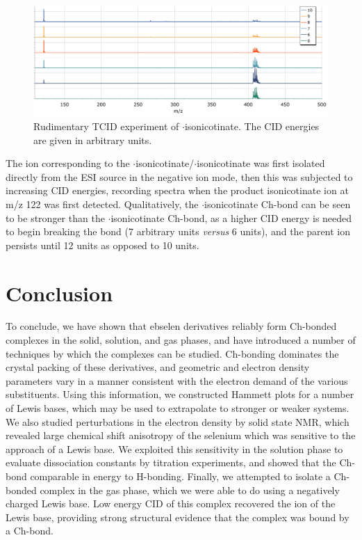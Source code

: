\begin{refsection}
\begin{figure}
  \centering
  \includegraphics[width=\linewidth]{Figures/ebs-bn-cid.pdf}
  \caption[TCID experiment of $ \cdot $isonicotinate.]{Rudimentary TCID experiment of $ \cdot $isonicotinate. The CID energies are given in arbitrary units.}\label{fig:ebs-bn-tcid}
\end{figure}

The ion corresponding to the $ \cdot $isonicotinate/$ \cdot $isonicotinate was first isolated directly from the ESI source in the negative ion mode, then this was subjected to increasing CID energies, recording spectra when the product isonicotinate ion at m/z 122 was first detected.
Qualitatively, the $ \cdot $isonicotinate Ch-bond can be seen to be stronger than the $ \cdot $isonicotinate Ch-bond, as a higher CID energy is needed to begin breaking the bond (7 arbitrary units \emph{versus} 6 units), and the parent ion persists until 12 units as opposed to 10 units.

\section{Conclusion}
To conclude, we have shown that ebselen derivatives reliably form Ch-bonded complexes in the solid, solution, and gas phases, and have introduced a number of techniques by which the complexes can be studied.
Ch-bonding dominates the crystal packing of these derivatives, and geometric and electron density parameters vary in a manner consistent with the electron demand of the various substituents.
Using this information, we constructed Hammett plots for a number of Lewis bases, which may be used to extrapolate to stronger or weaker systems.
We also studied perturbations in the electron density by solid state NMR, which revealed large chemical shift anisotropy of the selenium which was sensitive to the approach of a Lewis base.
We exploited this sensitivity in the solution phase to evaluate dissociation constants by titration experiments, and showed that the Ch-bond comparable in energy to H-bonding.
Finally, we attempted to isolate a Ch-bonded complex in the gas phase, which we were able to do using a negatively charged Lewis base.
Low energy CID of this complex recovered the ion of the Lewis base, providing strong structural evidence that the complex was bound by a Ch-bond.


\end{refsection}
